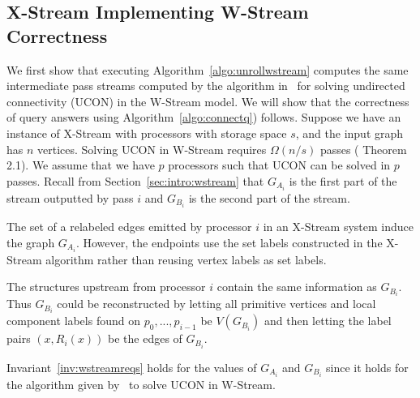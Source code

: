 \subsection{X-Stream Implementing W-Stream Correctness}
We first show that executing Algorithm~\ref{algo:unrollwstream} computes the same intermediate pass streams computed by the algorithm in~\cite{} for solving undirected connectivity (UCON) in the W-Stream model. We will show that the correctness of query answers using Algorithm~\ref{algo:connectq}) follows. Suppose we have an instance of X-Stream with processors with storage space $s$, and the input graph has $n$ vertices. Solving UCON in W-Stream requires $\Omega(n/s)$ passes (\cite{AMP:aggarwal2004streaming} Theorem 2.1). We assume that we have $p$ processors such that UCON can be solved in $p$ passes. Recall from Section~\ref{sec:intro:wstream} that $G_{A_i}$ is the first part of the stream outputted by pass $i$ and $G_{B_i}$ is the second part of the stream.
\begin{observation}\label{obs:ga}
The set of a relabeled edges emitted by processor $i$ in an X-Stream system induce the graph $G_{A_i}$. However, the endpoints use the set labels constructed in the X-Stream algorithm rather than reusing vertex labels as set labels.
\end{observation}


\begin{observation}\label{obs:gb}
The \uf structures upstream from processor $i$ contain the same information as $G_{B_i}$. Thus $G_{B_i}$ could be reconstructed by letting all primitive vertices and local component labels found on $p_0,...,p_{i-1}$ be $V(G_{B_i})$ and then letting the label pairs $(x,R_i(x))$ be the edges of $G_{B_i}$.
\end{observation}

Invariant~\ref{inv:wstreamreqs} holds for the values of $G_{A_i}$ and $G_{B_i}$ since it holds for the algorithm given by~\cite{AMP:aggarwal2004streaming} to solve UCON in W-Stream.

